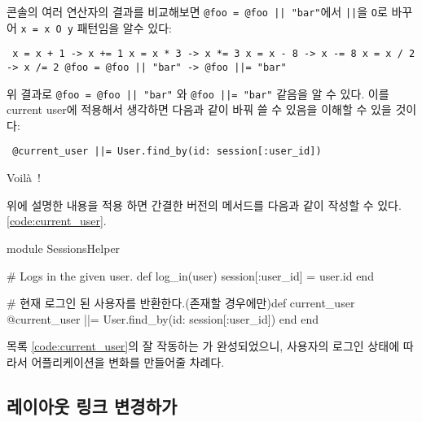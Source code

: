 \begin{aside}
콘솔의 여러 연산자의 결과를 비교해보면 \texttt{@foo = @foo || "bar"}에서 \texttt{||}을 \texttt{O}로 바꾸어 \texttt{x = x O y} 패턴임을 알수 있다: 

\begin{verbatim} x = x + 1 -> x += 1 x = x * 3 -> x *= 3 x = x - 8 -> x -= 8 x = x / 2 -> x /= 2 @foo = @foo || "bar" -> @foo ||= "bar" \end{verbatim} 

\noindent 위 결과로 \verb+@foo = @foo || "bar"+ 와 \verb+@foo ||= "bar"+ 같음을 알 수 있다. 이를 current user에 적용해서 생각하면 다음과 같이 바꿔 쓸 수 있음을 이해할 수 있을 것이다: 

\begin{verbatim} @current_user ||= User.find_by(id: session[:user_id]) \end{verbatim} 

\noindent Voil\`{a}~! 

\end{aside} 

위에 설명한 내용을 적용 하면 간결한 버전의 \linebreak {} 메서드를 다음과 같이 작성할 수 있다.\ref{code:current_user}. 

\begin{codelisting} \label{code:current_user}  

\begin{code} module SessionsHelper 

# Logs in the given user. def log_in(user) session[:user_id] = user.id end 

# 현재 로그인 된 사용자를 반환한다.(존재할 경우에만)def current_user @current_user ||= User.find_by(id: session[:user_id]) end end \end{code} \end{codelisting} 

\noindent 목록 \ref{code:current_user}의 잘 작동하는 가 완성되었으니, 사용자의 로그인 상태에 따라서 어플리케이션을 변화를 만들어줄 차례다. 

\subsection{레이아웃 링크 변경하가} \label{sec:changing_the_layout_links} 

